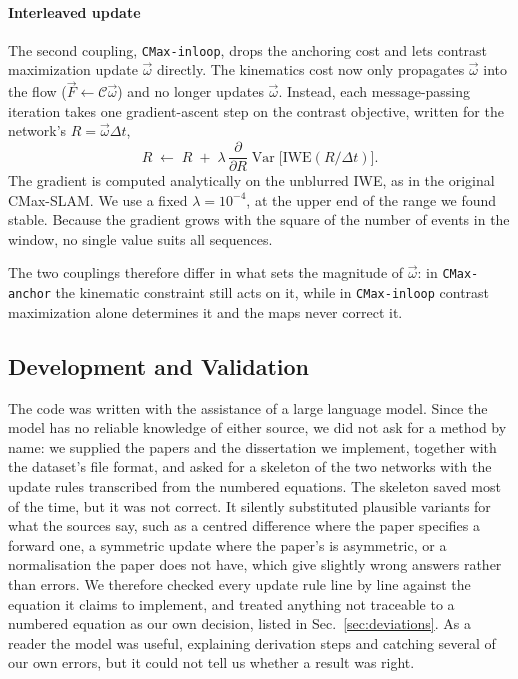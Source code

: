 \documentclass[journal]{IEEEtran}
\newcommand{\Fmap}{\vec{F}}
\newcommand{\Cmat}{\mathcal{C}}
\newcommand{\wvec}{\vec{\omega}}
\begin{document}
\paragraph{Interleaved update}
The second coupling, \texttt{CMax-inloop}, drops the anchoring cost and lets contrast maximization update $\wvec$ directly. The kinematics cost now only propagates $\wvec$ into the flow ($\Fmap \leftarrow \Cmat\wvec$) and no longer updates $\wvec$. Instead, each message-passing iteration takes one gradient-ascent step on the contrast objective, written for the network's $R = \wvec\Delta t$,
\begin{equation}
R \;\leftarrow\; R \;+\; \lambda\,
  \frac{\partial}{\partial R}\operatorname{Var}\!\big[\mathrm{IWE}(R/\Delta t)\big].
\label{eq:inloop}
\end{equation}
The gradient is computed analytically on the unblurred IWE, as in the original CMax-SLAM. We use a fixed $\lambda = 10^{-4}$, at the upper end of the range we found stable. Because the gradient grows with the square of the number of events in the window, no single value suits all sequences.

The two couplings therefore differ in what sets the magnitude of $\wvec$: in \texttt{CMax-anchor} the kinematic constraint still acts on it, while in \texttt{CMax-inloop} contrast maximization alone determines it and the maps never correct it. 

\subsection{Development and Validation}
\label{sec:validation}

The code was written with the assistance of a large language model. Since the model has no reliable knowledge of either source, we did not ask for a method by name: we supplied the papers and the dissertation we implement, together with the dataset's file format, and asked for a skeleton of the two networks with the update rules transcribed from the numbered equations. The skeleton saved most of the time, but it was not correct. It silently substituted plausible variants for what the sources say, such as a centred difference where the paper specifies a forward one, a symmetric update where the paper's is asymmetric, or a normalisation the paper does not have, which give slightly wrong answers rather than errors. We therefore checked every update rule line by line against the equation it claims to implement, and treated anything not traceable to a numbered equation as our own decision, listed in Sec.~\ref{sec:deviations}. As a reader the model was useful, explaining derivation steps and catching several of our own errors, but it could not tell us whether a result was right.
\end{document}
